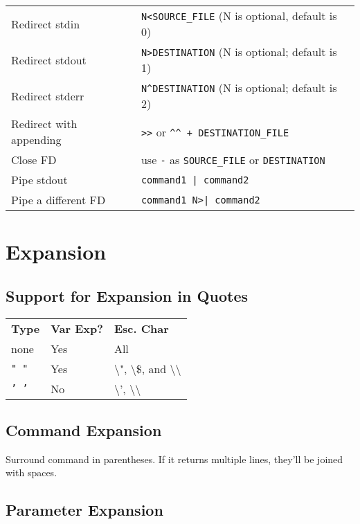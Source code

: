 \documentclass[10pt]{extarticle}
\begin{document}
\begin{paracol}{2}
\begin{tabularx}{\columnwidth}{X X}

    Redirect stdin & \texttt{N<SOURCE\_FILE} (N is optional, default is 0) \\
    Redirect stdout & \texttt{N>DESTINATION} (N is optional; default is 1) \\
    Redirect stderr & \texttt{N\^{}DESTINATION} (N is optional; default is 2) \\
    Redirect with appending & \texttt{>>} or \texttt{\^{}\^{} + DESTINATION\_FILE} \\
    Close FD & use \texttt{-} as \texttt{SOURCE\_FILE} or \texttt{DESTINATION} \\
    Pipe stdout & \texttt{command1 | command2} \\
    Pipe a different FD & \texttt{command1 N>| command2} \\

\end{tabularx}

\section*{Expansion}

\subsection*{Support for Expansion in Quotes}

\begin{tabularx}{\columnwidth}{X X X}
    \rowcolor{DarkBackground}
    \textbf{Type} & \textbf{Var Exp?} & \textbf{Esc. Char} \\
    none & Yes & All \\
    \texttt{" "} & Yes & \textbackslash", \textbackslash\$, and \textbackslash\textbackslash \\
    \texttt{' '} & No & \textbackslash', \textbackslash\textbackslash
\end{tabularx}

\subsection*{Command Expansion}

Surround command in parentheses.
If it returns multiple lines, they'll be joined with spaces.

\subsection*{Parameter Expansion}


\end{paracol}
\end{document}
